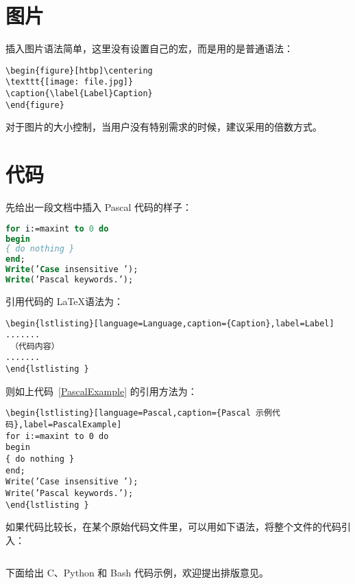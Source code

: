 \section{图片}
插入图片语法简单，这里没有设置自己的宏，而是用的是普通语法：
\begin{lstlisting}[language={[LaTeX]TeX},caption={插入图片语法示例}]
\begin{figure}[htbp]\centering
\texttt{[image: file.jpg]} 
\caption{\label{Label}Caption}
\end{figure}\end{lstlisting}
对于图片的大小控制，当用户没有特别需求的时候，建议采用的倍数方式。

\section{代码}
先给出一段文档中插入 Pascal 代码的样子：
\begin{lstlisting}[language=Pascal,caption={Pascal 代码示例},label=PascalExample]
for i:=maxint to 0 do
begin
{ do nothing }
end;
Write(’Case insensitive ’);
Write(’Pascal keywords.’);
\end{lstlisting}

引用代码的 \LaTeX 语法为：
\begin{lstlisting}[language={[LaTeX]TeX},caption={引用代码的语法}]
\begin{lstlisting}[language=Language,caption={Caption},label=Label]
.......
 （代码内容）
.......
\end{lstlisting }\end{lstlisting}

则如上代码~\ref{PascalExample} 的引用方法为：
\begin{lstlisting}[language={[LaTeX]TeX},caption={引用代码示例}]
\begin{lstlisting}[language=Pascal,caption={Pascal 示例代码},label=PascalExample]
for i:=maxint to 0 do
begin
{ do nothing }
end;
Write(’Case insensitive ’);
Write(’Pascal keywords.’);
\end{lstlisting }
\end{lstlisting}

如果代码比较长，在某个原始代码文件里，可以用如下语法，将整个文件的代码引入：
\begin{lstlisting}[language={[LaTeX]TeX},caption={引入代码文件示例}]

\end{lstlisting}

下面给出 C、Python 和 Bash 代码示例，欢迎提出排版意见。

